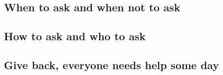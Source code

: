 \subsection{When to ask and when not to ask}
\label{sub:whenAsk}

\subsection{How to ask and who to ask}
\label{sub:whoAsk}


\subsection{Give back, everyone needs help some day}
\label{sub:gibHelp}
